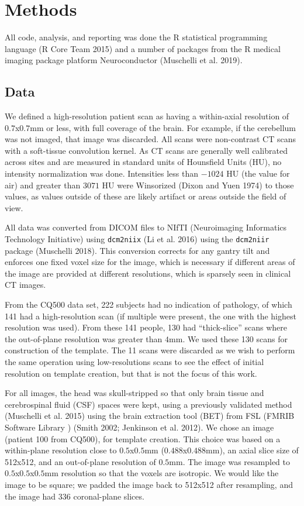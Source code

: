 \documentclass[]{elsarticle} %
\begin{document}
\hypertarget{methods}{%
\section{Methods}\label{methods}}

All code, analysis, and reporting was done the R statistical programming language (R Core Team 2015) and a number of packages from the R medical imaging package platform Neuroconductor (Muschelli et al. 2019).

\hypertarget{data}{%
\subsection{Data}\label{data}}

We defined a high-resolution patient scan as having a within-axial resolution of \(0.7\)x\(0.7\)mm or less, with full coverage of the brain. For example, if the cerebellum was not imaged, that image was discarded. All scans were non-contrast CT scans with a soft-tissue convolution kernel. As CT scans are generally well calibrated across sites and are measured in standard units of Hounsfield Units (HU), no intensity normalization was done. Intensities less than \(-1024\) HU (the value for air) and greater than \(3071\) HU were Winsorized (Dixon and Yuen 1974) to those values, as values outside of these are likely artifact or areas outside the field of view.

All data was converted from DICOM files to NIfTI (Neuroimaging Informatics Technology Initiative) using \texttt{dcm2niix} (Li et al. 2016) using the \texttt{dcm2niir} package (Muschelli 2018). This conversion corrects for any gantry tilt and enforces one fixed voxel size for the image, which is necessary if different areas of the image are provided at different resolutions, which is sparsely seen in clinical CT images.

From the CQ500 data set, 222 subjects had no indication of pathology, of which 141 had a high-resolution scan (if multiple were present, the one with the highest resolution was used). From these 141 people, 130 had ``thick-slice'' scans where the out-of-plane resolution was greater than \(4\)mm. We used these 130 scans for construction of the template. The 11 scans were discarded as we wish to perform the same operation using low-resolutions scans to see the effect of initial resolution on template creation, but that is not the focus of this work.

For all images, the head was skull-stripped so that only brain tissue and cerebrospinal fluid (CSF) spaces were kept, using a previously validated method (Muschelli et al. 2015) using the brain extraction tool (BET) from FSL (FMRIB Software Library
) (Smith 2002; Jenkinson et al. 2012). We chose an image (patient 100 from CQ500), for template creation. This choice was based on a within-plane resolution close to \(0.5\)x\(0.5\)mm (\(0.488\)x\(0.488\)mm), an axial slice size of 512x512, and an out-of-plane resolution of \(0.5\)mm. The image was resampled to \(0.5\)x\(0.5\)x\(0.5\)mm resolution so that the voxels are isotropic. We would like the image to be square; we padded the image back to 512x512 after resampling, and the image had 336 coronal-plane slices.
\end{document}
